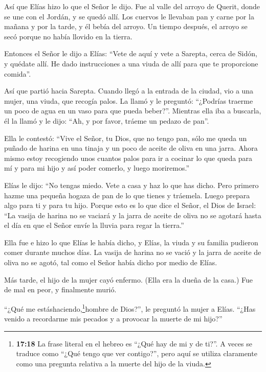  Así que Elías hizo lo que el Señor le dijo. Fue al valle
del arroyo de Querit, donde se une con el Jordán, y se quedó allí.
 Los cuervos le llevaban pan y carne por la mañana y por la
tarde, y él bebía del arroyo.  Un tiempo después, el arroyo
se secó porque no había llovido en la tierra.

 Entonces el Señor le dijo a Elías:  ``Vete de
aquí y vete a Sarepta, cerca de Sidón, y quédate allí. He dado
instrucciones a una viuda de allí para que te proporcione comida''.

 Así que partió hacia Sarepta. Cuando llegó a la entrada de
la ciudad, vio a una mujer, una viuda, que recogía palos. La llamó y le
preguntó: ``¿Podrías traerme un poco de agua en un vaso para que pueda
beber?''.  Mientras ella iba a buscarla, él la llamó y le
dijo: ``Ah, y por favor, tráeme un pedazo de pan''.

 Ella le contestó: ``Vive el Señor, tu Dios, que no tengo
pan, sólo me queda un puñado de harina en una tinaja y un poco de aceite
de oliva en una jarra. Ahora mismo estoy recogiendo unos cuantos palos
para ir a cocinar lo que queda para mí y para mi hijo y así poder
comerlo, y luego moriremos.''

 Elías le dijo: ``No tengas miedo. Vete a casa y haz lo que
has dicho. Pero primero hazme una pequeña hogaza de pan de lo que tienes
y tráemela. Luego prepara algo para ti y para tu hijo. 
Porque esto es lo que dice el Señor, el Dios de Israel: ``La vasija de
harina no se vaciará y la jarra de aceite de oliva no se agotará hasta
el día en que el Señor envíe la lluvia para regar la tierra.''

 Ella fue e hizo lo que Elías le había dicho, y Elías, la
viuda y su familia pudieron comer durante muchos días.  La
vasija de harina no se vació y la jarra de aceite de oliva no se agotó,
tal como el Señor había dicho por medio de Elías.

 Más tarde, el hijo de la mujer cayó enfermo. (Ella era la
dueña de la casa.) Fue de mal en peor, y finalmente murió.

 ``¿Qué me estáshaciendo,\footnote{\textbf{17:18} La frase
  literal en el hebreo es ``¿Qué hay de mi y de ti?''. A veces se
  traduce como ``¿Qué tengo que ver contigo?'', pero aquí se utiliza
  claramente como una pregunta relativa a la muerte del hijo de la
  viuda.}hombre de Dios?'', le preguntó la mujer a Elías. ``¿Has venido
a recordarme mis pecados y a provocar la muerte de mi hijo?''

